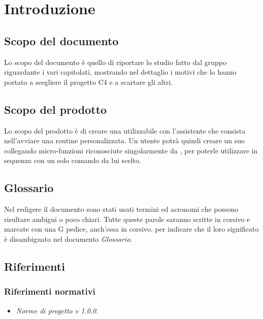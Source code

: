 \clearpage
\section{Introduzione}
    \subsection{Scopo del documento}
    Lo scopo del documento è quello di riportare lo studio fatto dal gruppo riguardante i vari capitolati, mostrando nel dettaglio i motivi che lo hanno portato a scegliere il progetto C4 e a scartare gli altri.
    
    \subsection{Scopo del prodotto}
    Lo scopo del prodotto è di creare una  utilizzabile con l'assistente  che consista nell'avviare una routine personalizzata. Un utente potrà quindi creare un suo  collegando micro-funzioni riconosciute singolarmente da , per poterle utilizzare in sequenza con un solo comando da lui scelto.
    
    \subsection{Glossario}
    Nel redigere il documento sono stati usati termini ed acronomi che possono risultare ambigui o poco chiari. Tutte queste parole saranno scritte in corsivo e marcate con una G pedice, anch'essa in corsivo, per indicare che il loro significato è disambiguato nel documento \emph{Glossario}.
    
    \subsection{Riferimenti}
    
    \subsubsection{Riferimenti normativi}
    \begin{itemize}
        \item \emph{Norme di progetto v 1.0.0}. %
    \end{itemize}
    
